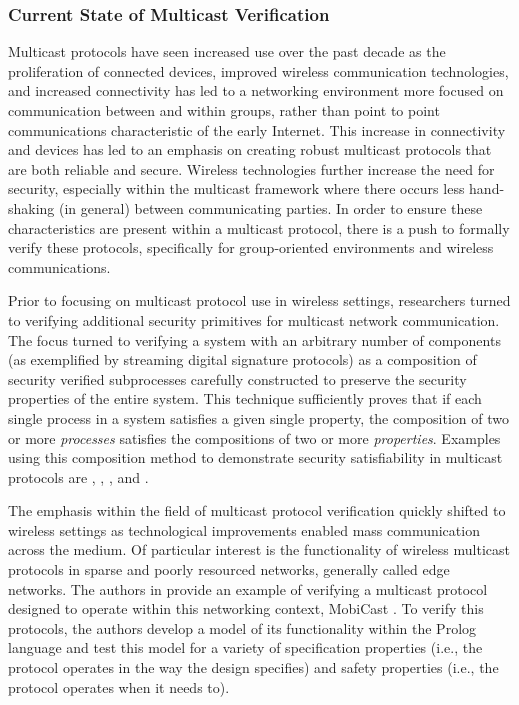 \documentclass[10pt, journal]{IEEEtran}
\begin{document}
\subsubsection{Current State of Multicast Verification}
Multicast protocols have seen increased use over the past decade as the proliferation of connected devices, improved wireless communication technologies, and increased connectivity has led to a networking environment more focused on communication between and within groups, rather than point to point communications characteristic of the early Internet. This increase in connectivity and devices has led to an emphasis on creating robust multicast protocols that are both reliable and secure. Wireless technologies further increase the need for security, especially within the multicast framework where there occurs less hand-shaking (in general) between communicating parties. In order to ensure these characteristics are present within a multicast protocol, there is a push to formally verify these protocols, specifically for group-oriented environments and wireless communications. 

Prior to focusing on multicast protocol use in wireless settings, researchers turned to verifying additional security primitives for multicast network communication. The focus turned to verifying a system with an arbitrary number of components (as exemplified by streaming digital signature protocols) as a composition of security verified subprocesses carefully constructed to preserve the security properties of the entire system. This technique sufficiently proves that if each single process in a system satisfies a given single property, the composition of two or more \textit{processes} satisfies the compositions of two or more \textit{properties}. Examples using this composition method to demonstrate security satisfiability in multicast protocols are \cite{Gorrieri2008}, \cite{Martina2015}, \cite{Bella2002}, and \cite{Archer2002}.

The emphasis within the field of multicast protocol verification quickly shifted to wireless settings as technological improvements enabled mass communication across the medium. Of particular interest is the functionality of wireless multicast protocols in sparse and poorly resourced networks, generally called edge networks. The authors in \cite{Borujerdi2004} provide an example of verifying a multicast protocol designed to operate within this networking context, MobiCast \cite{Tan2000}. To verify this protocols, the authors develop a model of its functionality within the Prolog language and test this model for a variety of specification properties (i.e., the protocol operates in the way the design specifies) and safety properties (i.e., the protocol operates when it needs to). 
\end{document}
